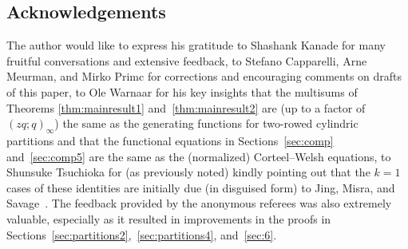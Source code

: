 \documentclass[pdftex]{sigma}
\numberwithin{equation}{section}
\theoremstyle{definition}
\begin{document}
\subsection*{Acknowledgements}

The author would like to express his gratitude to Shashank Kanade for many fruitful conversations and extensive feedback, to Stefano Capparelli, Arne Meurman, and Mirko Primc for corrections and encouraging comments on drafts of this paper, to Ole Warnaar for his key insights that the multisums of Theorems \ref{thm:mainresult1} and~\ref{thm:mainresult2} are (up to a factor of $(zq;q)_\infty$) the same as the generating functions for two-rowed cylindric partitions and that the functional equations in Sections~\ref{sec:comp} and~\ref{sec:comp5} are the same as the (normalized) Corteel--Welsh equations, to Shunsuke Tsuchioka for (as previously noted) kindly pointing out that the $k=1$ cases of these identities are initially due (in disguised form) to Jing, Misra, and Savage~\cite{JMS}. The feedback provided by the anonymous referees was also extremely valuable, especially as it resulted in improvements in the proofs in Sections~\ref{sec:partitions2},~\ref{sec:partitions4}, and~\ref{sec:6}.

%
%
\end{document}
